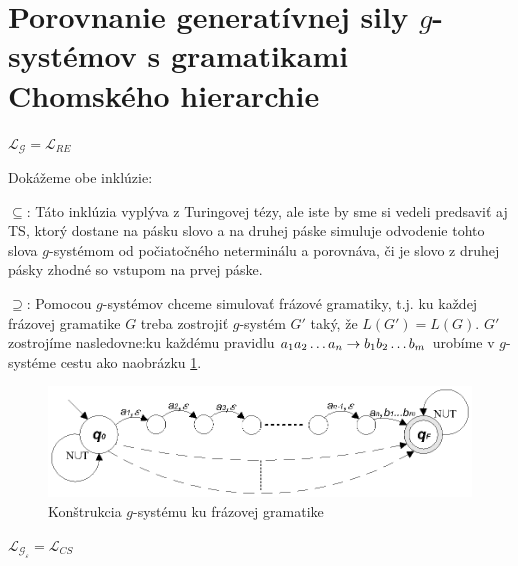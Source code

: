 \section{Porovnanie generatívnej sily $g$-systémov s gramatikami Chomského hierarchie}

\begin{veta}
\label{gs_veta_gre} $\mathcal{L}_{\mathcal{G}}=\mathcal{L}_{RE}$
\end{veta}

\begin{dokaz}
Dokážeme obe inklúzie:
\begin{description}
\item{$\subseteq$:} Táto inklúzia vyplýva z Turingovej tézy, ale
iste by sme si vedeli predsaviť aj TS, ktorý dostane na pásku
slovo a na druhej páske simuluje odvodenie tohto slova
$g$-systémom od počiatočného neterminálu a porovnáva, či je slovo
z druhej pásky zhodné so vstupom na prvej páske.
\item{$\supseteq$:} Pomocou $g$-systémov chceme simulovať frázové gramatiky, t.j. ku každej
frázovej gramatike $G$ treba zostrojiť $g$-systém $G'$ taký, že
$L(G')=L(G)$. $G'$ zostrojíme nasledovne:\newline ku každému
pravidlu $a_1a_2\dots a_n\rightarrow b_1b_2\dots b_m$ urobíme v
$g$-systéme cestu ako na\linebreak obrázku \ref{gs_obr_gre}.
\end{description}
\end{dokaz}

\begin{figure}[!ht]
\centering
\includegraphics{img/gsystems/re_g}
\caption{Konštrukcia $g$-systému ku frázovej gramatike}\label{gs_obr_gre}
\end{figure}

\pagebreak

\begin{veta}
\label{gs_veta_gre2}
$\mathcal{L}_{\mathcal{G}_\varepsilon}=\mathcal{L}_{CS}$
\end{veta}

